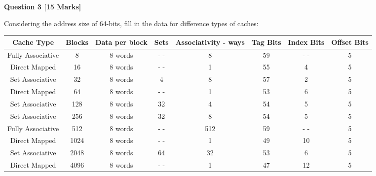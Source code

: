 \documentclass[addpoints]{exam}
\begin{document}
\begin{sloppypar}
\begin{questions}
    \pagebreak
    \question[15]
    \begin{center} \textbf{Question 3 [15 Marks]}\end{center}
    Considering the address size of 64-bits, fill in the data for difference types of caches:

    \begin{tabular}{| c | c | c | c | c | c | c | c |}
        \hline
        Cache Type & Blocks & \parbox[c][10mm]{15mm}{\centering Data per block} & Sets & \parbox[c][10mm]{22mm}{\centering Associativity - ways} & \parbox[c][10mm]{10mm}{\centering Tag Bits} & \parbox[c][10mm]{10mm}{\centering Index Bits} & \parbox[c][10mm]{10mm}{\centering Offset  Bits} \\ \hline
        Fully Associative & 8 & 8 words & - - & 8 & 59 & - - & 5 \\ \hline
        Direct Mapped & 16 & 8 words & - - & 1 & 55 & 4 & 5 \\ \hline
        Set Associative & 32 & 8 words & 4 & 8 & 57 & 2 & 5 \\ \hline
        Direct Mapped & 64 & 8 words & - - & 1 & 53 & 6 & 5 \\ \hline
        Set Associative & 128 & 8 words & 32 & 4 & 54 & 5 & 5 \\ \hline
        Set Associative & 256 & 8 words & 32 & 8 & 54 & 5 & 5 \\ \hline
        Fully Associative & 512 & 8 words & - - & 512 & 59 & - - & 5 \\ \hline
        Direct Mapped & 1024 & 8 words & - - & 1 & 49 & 10 & 5 \\ \hline
        Set Associative & 2048 & 8 words & 64 & 32 & 53 & 6 & 5 \\ \hline
        Direct Mapped & 4096 & 8 words & - - & 1 & 47 & 12 & 5 \\ \hline
    \end{tabular}



\end{questions}
\end{sloppypar}
\end{document}

